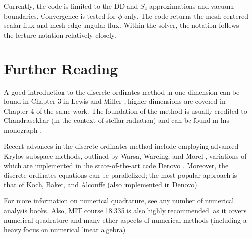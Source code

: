 Currently, the code is limited to the DD and $S_4$ approximations and vacuum boundaries.  Convergence is tested for $\phi$ only.  The code returns the mesh-centered scalar flux and mesh-edge angular flux.  Within the solver, the notation follows the lecture notation relatively closely.



\section*{Further Reading}

A good introduction to the discrete ordinates method in one dimension can be found in 
Chapter 3 in Lewis and Miller \cite{lewis1993cmn}; higher dimensions are covered 
in Chapter 4 of the same work.  The foundation of the method is usually credited 
to Chandrasekhar (in the context of stellar radiation) and can be found in his 
monograph \cite{chandrasekhar1950rt}.  


Recent advances in the discrete ordinates method include employing advanced 
Krylov subspace methods, outlined by Warsa, Wareing, and Morel 
\cite{warsa2004kim}, variations of which are implemented in the state-of-the-art 
code Denovo \cite{evans2010dnt}.  Moreover, the discrete ordinates equations can 
be parallelized; the most popular approach is that of Koch, Baker, and Alcouffe 
\cite{koch1992sfo} (also implemented in Denovo).

For more information on numerical quadrature, see any number of numerical 
analysis books.  Also, MIT course 18.335 is also highly recommended, as it 
covers numerical quadrature and many other aspects of numerical methods 
(including a heavy focus on numerical linear algebra).

